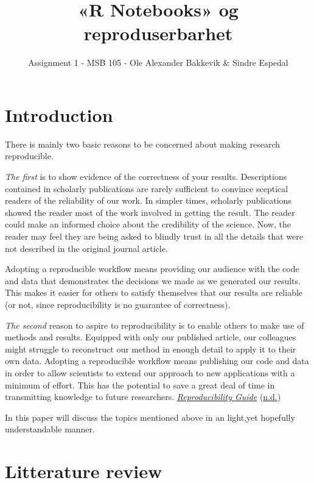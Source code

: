 \documentclass[
  12pt,
]{article}
\title{«R Notebooks» og reproduserbarhet}
\author{Assignment 1 - MSB 105 - Ole Alexander Bakkevik \& Sindre
Espedal}
\date{}
\begin{document}
\maketitle

\hypertarget{introduction}{%
\section{Introduction}\label{introduction}}

There is mainly two basic reasons to be concerned about making research
reproducible.

\emph{The first} is to show evidence of the correctness of your results.
Descriptions contained in scholarly publications are rarely sufficient
to convince sceptical readers of the reliability of our work. In simpler
times, scholarly publications showed the reader most of the work
involved in getting the result. The reader could make an informed choice
about the credibility of the science. Now, the reader may feel they are
being asked to blindly trust in all the details that were not described
in the original journal article.

Adopting a reproducible workflow means providing our audience with the
code and data that demonstrates the decisions we made as we generated
our results. This makes it easier for others to satisfy themselves that
our results are reliable (or not, since reproducibility is no guarantee
of correctness).

\emph{The second} reason to aspire to reproducibility is to enable
others to make use of methods and results. Equipped with only our
published article, our colleagues might struggle to reconstruct our
method in enough detail to apply it to their own data. Adopting a
reproducible workflow means publishing our code and data in order to
allow scientists to extend our approach to new applications with a
minimum of effort. This has the potential to save a great deal of time
in transmitting knowledge to future researchers.
\protect\hyperlink{ref-Git-reproducabilty}{\emph{Reproducibility Guide}}
(\protect\hyperlink{ref-Git-reproducabilty}{n.d.})

In this paper will discuss the topics mentioned above in an light,yet
hopefully understandable manner.

\hypertarget{litterature-review}{%
\section{Litterature review}\label{litterature-review}}
\end{document}
